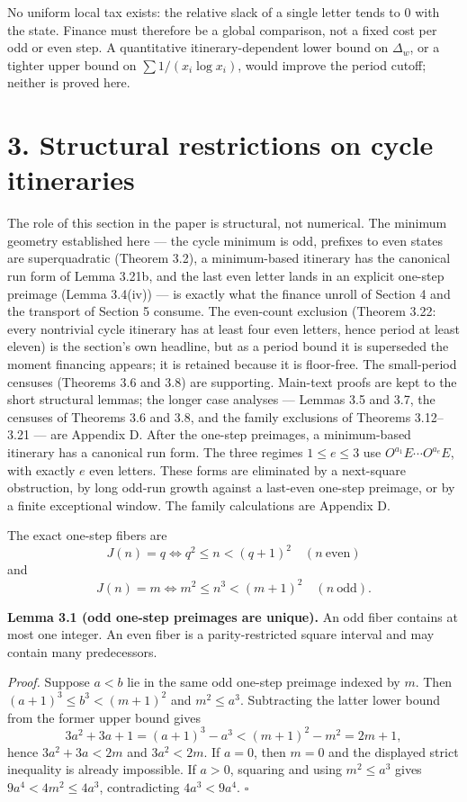 \documentclass[12pt]{article}
\begin{document}
No uniform local tax exists: the relative slack of a single letter tends
to \(0\) with the state. Finance must therefore be a global comparison,
not a fixed cost per odd or even step. A quantitative
itinerary-dependent lower bound on \(\Delta_w\), or a tighter upper
bound on \(\sum 1/(x_i\log x_i)\), would improve the period cutoff;
neither is proved here.

\section{3. Structural restrictions on cycle
itineraries}\label{structural-restrictions-on-cycle-itineraries}

The role of this section in the paper is structural, not numerical. The
minimum geometry established here --- the cycle minimum is odd, prefixes
to even states are superquadratic (Theorem 3.2), a minimum-based
itinerary has the canonical run form of Lemma 3.21b, and the last even
letter lands in an explicit one-step preimage (Lemma 3.4(iv)) --- is
exactly what the finance unroll of Section 4 and the transport of
Section 5 consume. The even-count exclusion (Theorem 3.22: every
nontrivial cycle itinerary has at least four even letters, hence period
at least eleven) is the section's own headline, but as a period bound it
is superseded the moment financing appears; it is retained because it is
floor-free. The small-period censuses (Theorems 3.6 and 3.8) are
supporting. Main-text proofs are kept to the short structural lemmas;
the longer case analyses --- Lemmas 3.5 and 3.7, the censuses of
Theorems 3.6 and 3.8, and the family exclusions of Theorems 3.12--3.21
--- are Appendix D. After the one-step preimages, a minimum-based
itinerary has a canonical run form. The three regimes \(1\le e\le3\) use
\(O^{a_1}E\cdots O^{a_e}E\), with exactly \(e\) even letters. These
forms are eliminated by a next-square obstruction, by long odd-run
growth against a last-even one-step preimage, or by a finite exceptional
window. The family calculations are Appendix D.

The exact one-step fibers are \[
J(n)=q\iff q^2\le n<(q+1)^2
\quad(n\ \text{even})
\] and \[
J(n)=m\iff m^2\le n^3<(m+1)^2
\quad(n\ \text{odd}).
\]

\textbf{Lemma 3.1 (odd one-step preimages are unique).} An odd fiber
contains at most one integer. An even fiber is a parity-restricted
square interval and may contain many predecessors.

\emph{Proof.} Suppose \(a<b\) lie in the same odd one-step preimage
indexed by \(m\). Then \((a+1)^3\le b^3<(m+1)^2\) and \(m^2\le a^3\).
Subtracting the latter lower bound from the former upper bound gives \[
3a^2+3a+1=(a+1)^3-a^3<(m+1)^2-m^2=2m+1,
\] hence \(3a^2+3a<2m\) and \(3a^2<2m\). If \(a=0\), then \(m=0\) and
the displayed strict inequality is already impossible. If \(a>0\),
squaring and using \(m^2\le a^3\) gives \(9a^4<4m^2\le 4a^3\),
contradicting \(4a^3<9a^4\). \(\square\)
\end{document}
